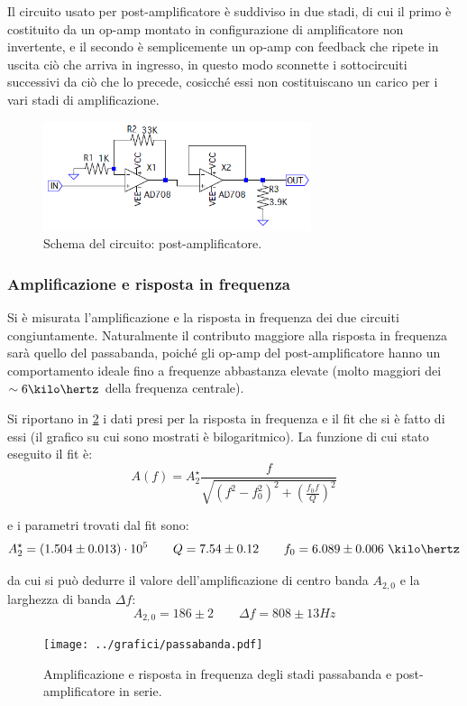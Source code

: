 \documentclass[a4paper,10pt]{article}
\begin{document}
Il circuito usato per post-amplificatore è suddiviso in due stadi, di cui il primo è costituito da un op-amp montato in configurazione di amplificatore non invertente, e il secondo è semplicemente un op-amp con feedback che ripete in uscita ciò che arriva in ingresso, in questo modo sconnette i sottocircuiti successivi da ciò che lo precede, cosicché essi non costituiscano un carico per i vari stadi di amplificazione. 

\begin{figure}[H]
	\vspace{-10pt}
	\centering
	\includegraphics[width=0.7\textwidth]{../grafici/PostAmp.png}
	\vspace{-12pt}
	\caption{Schema del circuito: post-amplificatore.}
	\label{fig:postamp}
	\vspace{-6pt}
\end{figure}

\subsubsection*{Amplificazione e risposta in frequenza}

Si è misurata l'amplificazione e la risposta in frequenza dei due circuiti congiuntamente. Naturalmente il contributo maggiore alla risposta in frequenza sarà quello del passabanda, poiché gli op-amp del post-amplificatore hanno un comportamento ideale fino a frequenze abbastanza elevate (molto maggiori dei $\sim 6 \kilo\hertz $ della frequenza centrale).

Si riportano in \cref{fig:FITbandpass} i dati presi per la risposta in frequenza e il fit che si è fatto di essi (il grafico su cui sono mostrati è bilogaritmico).
La funzione di cui stato eseguito il fit è:
\[ A(f) = A_2^\star \frac{f}{\sqrt{(f^2-f_0^2)^2 + \left(\frac{f_0 f}{Q}\right)^2}} \]

e i parametri trovati dal fit sono:
\[ A_2^\star=(1.504 \pm 0.013)\cdot10^5 \qquad Q=7.54 \pm 0.12 \qquad f_0=6.089 \pm 0.006~\kilo\hertz  \]

da cui si può dedurre il valore dell'amplificazione di centro banda $ A_{2,0} $ e la larghezza di banda $ \Delta f $:
\[ A_{2,0} = 186 \pm 2	\qquad	\Delta f = 808 \pm 13 Hz \]
\vspace*{-30pt}
\begin{figure}[H]
	\centering
	\texttt{[image: ../grafici/passabanda.pdf]}
	\vspace*{-5pt}
	\caption{Amplificazione e risposta in frequenza degli stadi passabanda e post-amplificatore in serie.}
	\label{fig:FITbandpass}
\end{figure}
\end{document}
